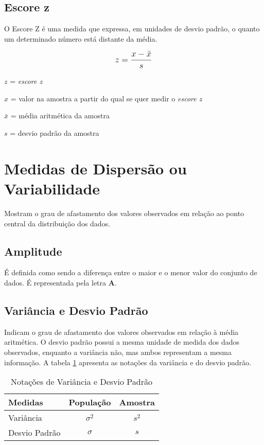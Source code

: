 \subsection{Escore z}

O Escore Z é uma medida que expressa, em unidades de desvio padrão, o quanto um determinado número está distante da média.

\[\beq{ z = \frac{x-\bar{x}}{s} }\]

\(z\) = \emph{escore z}

\(x\) = valor na amostra a partir do qual se quer medir o \emph{escore z}

\(\bar{x}\) = média aritmética da amostra

\(s\) = desvio padrão da amostra

\section{Medidas de Dispersão ou Variabilidade}

Mostram o grau de afastamento dos valores observados em relação ao ponto central da distribuição dos dados.

\subsection{Amplitude}

É definida como sendo a diferença entre o maior e o menor valor
do conjunto de dados. É representada pela letra \textbf{A}.

\subsection{Variância e Desvio Padrão}

Indicam o grau de afastamento dos valores observados em relação à média aritmética. O desvio padrão possui a mesma unidade de medida dos dados observados, enquanto a variância não, mas ambos representam a mesma informação. A tabela \ref{tab:notacoes-var-dp} apresenta as notações da variância e do desvio padrão.

\begin{table}[h]
	\centering	
	\caption{Notações de Variância e Desvio Padrão}
	\label{tab:notacoes-var-dp}
	\begin{tabular}{l|cc} 
		Medidas 		& População 	& Amostra 		\\
		\hline
		Variância		& \(\sigma^2 \)	& \(s^2\)	\\
		Desvio Padrão	& \(\sigma \)	& \(s\)
	\end{tabular}
\end{table}


